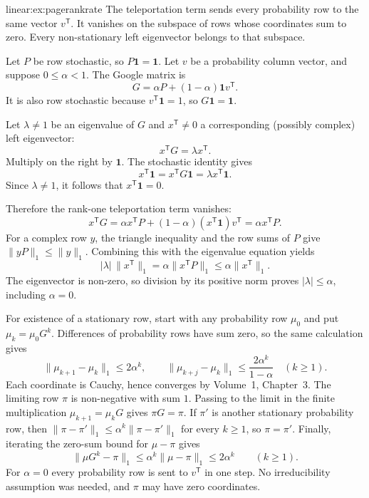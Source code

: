 \begin{solution}{linear:ex:pagerankrate}
\idea The teleportation term sends every probability row to the same vector $v^{\mathsf T}$. It vanishes on the subspace of rows whose coordinates sum to zero. Every non-stationary left eigenvector belongs to that subspace.

\writeup Let $P$ be row stochastic, so $P\mathbf1=\mathbf1$. Let $v$ be a probability column vector, and suppose $0\le\alpha<1$. The Google matrix is
\[
G=\alpha P+(1-\alpha)\mathbf1v^{\mathsf T}.
\]
It is also row stochastic because $v^{\mathsf T}\mathbf1=1$, so $G\mathbf1=\mathbf1$.

Let $\lambda\ne1$ be an eigenvalue of $G$ and $x^{\mathsf T}\ne0$ a corresponding (possibly complex) left eigenvector:
\[
x^{\mathsf T}G=\lambda x^{\mathsf T}.
\]
Multiply on the right by $\mathbf1$. The stochastic identity gives
\[
x^{\mathsf T}\mathbf1
=x^{\mathsf T}G\mathbf1
=\lambda x^{\mathsf T}\mathbf1.
\]
Since $\lambda\ne1$, it follows that $x^{\mathsf T}\mathbf1=0$.

Therefore the rank-one teleportation term vanishes:
\[
x^{\mathsf T}G
=\alpha x^{\mathsf T}P
+(1-\alpha)(x^{\mathsf T}\mathbf1)v^{\mathsf T}
=\alpha x^{\mathsf T}P.
\]
For a complex row $y$, the triangle inequality and the row sums of $P$ give
$\|yP\|_1\le\|y\|_1$. Combining this with the eigenvalue equation yields
\[
|\lambda|\,\|x^{\mathsf T}\|_1
=\alpha\|x^{\mathsf T}P\|_1
\le\alpha\|x^{\mathsf T}\|_1.
\]
The eigenvector is non-zero, so division by its positive norm proves
$|\lambda|\le\alpha$, including $\alpha=0$.

For existence of a stationary row, start with any probability row $\mu_0$
and put $\mu_k=\mu_0G^k$. Differences of probability rows have sum zero,
so the same calculation gives
\[
\|\mu_{k+1}-\mu_k\|_1\le2\alpha^k,\qquad
\|\mu_{k+j}-\mu_k\|_1\le\frac{2\alpha^k}{1-\alpha}\quad(k\ge1).
\]
Each coordinate is Cauchy, hence converges by Volume~1, Chapter~3.
The limiting row $\pi$ is non-negative with sum $1$. Passing to the limit
in the finite multiplication $\mu_{k+1}=\mu_kG$ gives $\pi G=\pi$.
If $\pi'$ is another stationary probability row, then
$\|\pi-\pi'\|_1\le\alpha^k\|\pi-\pi'\|_1$ for every $k\ge1$,
so $\pi=\pi'$. Finally, iterating the zero-sum bound for $\mu-\pi$ gives
\[
\boxed{\|\mu G^k-\pi\|_1\le\alpha^k\|\mu-\pi\|_1\le2\alpha^k}
\qquad(k\ge1).
\]
For $\alpha=0$ every probability row is sent to $v^{\mathsf T}$ in one step.
No irreducibility assumption was needed, and $\pi$ may have zero coordinates.
\end{solution}

